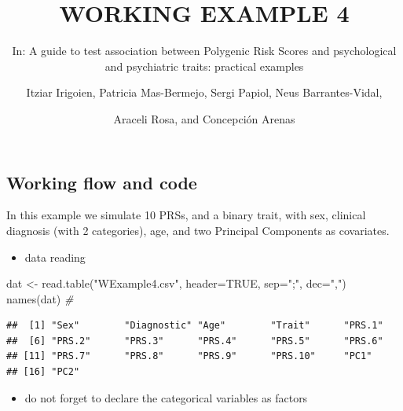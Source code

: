\documentclass[
]{article}
\title{WORKING EXAMPLE 4}
\subtitle{In: A guide to test association between Polygenic Risk Scores
and psychological and psychiatric traits: practical examples}
\author{Itziar Irigoien, Patricia Mas-Bermejo, Sergi Papiol, Neus
Barrantes-Vidal, \and Araceli Rosa, and Concepción Arenas}
\date{}
\newenvironment{Shaded}{\begin{snugshade}}{\end{snugshade}}
\newcommand{\AttributeTok}[1]{\textcolor[rgb]{0.77,0.63,0.00}{#1}}
\newcommand{\CommentTok}[1]{\textcolor[rgb]{0.56,0.35,0.01}{\textit{#1}}}
\newcommand{\ConstantTok}[1]{\textcolor[rgb]{0.00,0.00,0.00}{#1}}
\newcommand{\FunctionTok}[1]{\textcolor[rgb]{0.00,0.00,0.00}{#1}}
\newcommand{\NormalTok}[1]{#1}
\newcommand{\OtherTok}[1]{\textcolor[rgb]{0.56,0.35,0.01}{#1}}
\newcommand{\SpecialCharTok}[1]{\textcolor[rgb]{0.00,0.00,0.00}{#1}}
\newcommand{\StringTok}[1]{\textcolor[rgb]{0.31,0.60,0.02}{#1}}
\providecommand{\tightlist}{%
  \setlength{\itemsep}{0pt}\setlength{\parskip}{0pt}}
\begin{document}
\maketitle

\hypertarget{working-flow-and-code}{%
\subsection{Working flow and code}\label{working-flow-and-code}}

In this example we simulate 10 PRSs, and a binary trait, with sex,
clinical diagnosis (with 2 categories), age, and two Principal
Components as covariates.

\begin{itemize}
\tightlist
\item
  data reading
\end{itemize}

\begin{Shaded}
\begin{Highlighting}[]
\NormalTok{dat }\OtherTok{\textless{}{-}} \FunctionTok{read.table}\NormalTok{(}\StringTok{"WExample4.csv"}\NormalTok{, }\AttributeTok{header=}\ConstantTok{TRUE}\NormalTok{, }\AttributeTok{sep=}\StringTok{";"}\NormalTok{, }\AttributeTok{dec=}\StringTok{","}\NormalTok{)}
\FunctionTok{names}\NormalTok{(dat) }\CommentTok{\#}
\end{Highlighting}
\end{Shaded}

\begin{verbatim}
##  [1] "Sex"        "Diagnostic" "Age"        "Trait"      "PRS.1"     
##  [6] "PRS.2"      "PRS.3"      "PRS.4"      "PRS.5"      "PRS.6"     
## [11] "PRS.7"      "PRS.8"      "PRS.9"      "PRS.10"     "PC1"       
## [16] "PC2"
\end{verbatim}

\bigskip

\begin{itemize}
\tightlist
\item
  do not forget to declare the categorical variables as factors
\end{itemize}

\begin{Shaded}
\end{Shaded}
\end{document}

